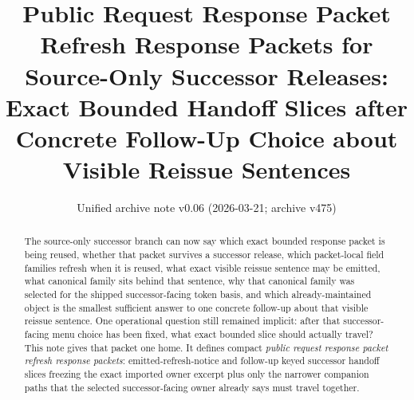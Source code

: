 \documentclass[11pt]{article}
\title{Public Request Response Packet Refresh Response Packets for Source-Only Successor Releases:\\[0.5ex]
\large Exact Bounded Handoff Slices after Concrete Follow-Up Choice about Visible Reissue Sentences}
\author{}
\date{Unified archive note v0.06 (2026-03-21; archive v475)}
\begin{document}
\maketitle

\begin{abstract}
The source-only successor branch can now say which exact bounded response packet is being reused, whether that packet survives a successor release, which packet-local field families refresh when it is reused, what exact visible reissue sentence may be emitted, what canonical family sits behind that sentence, why that canonical family was selected for the shipped successor-facing token basis, and which already-maintained object is the smallest sufficient answer to one concrete follow-up about that visible reissue sentence. One operational question still remained implicit: after that successor-facing menu choice has been fixed, what exact bounded slice should actually travel? This note gives that packet one home. It defines compact \emph{public request response packet refresh response packets}: emitted-refresh-notice and follow-up keyed successor handoff slices freezing the exact imported owner excerpt plus only the narrower companion paths that the selected successor-facing owner already says must travel together.
\end{abstract}
\end{document}
